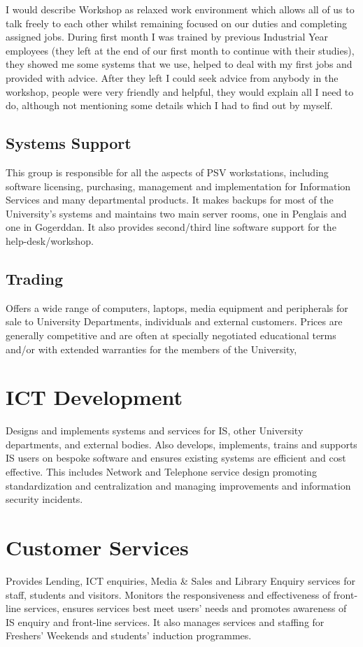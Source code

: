 \documentclass[10pt,a4paper,headinclude=true]{report}
\begin{document}
I would describe Workshop as relaxed work environment which allows all of us to talk freely to each other whilst remaining focused on our duties and completing assigned jobs. During first month I was trained by previous Industrial Year employees (they left at the end of our first month to continue with their studies), they showed me some systems that we use, helped to deal with my first jobs and provided with advice. After they left I could seek advice from anybody in the workshop, people were very friendly and helpful, they would explain all I need to do, although not mentioning some details which I had to find out by myself.
\subsection{Systems Support}
This group is responsible for all the aspects of PSV workstations, including software licensing, purchasing, management and implementation for Information Services and many departmental products. It makes backups for most of the University's systems and maintains two main server rooms, one in Penglais and one in Gogerddan. It also provides second/third line software support for the help-desk/workshop.
\subsection{Trading}
Offers a wide range of computers, laptops, media equipment and peripherals for sale to University Departments, individuals and external customers. Prices are generally competitive and are often at specially negotiated educational terms and/or with extended warranties for the members of the University,
\section{ICT Development}
Designs and implements systems and services for IS, other University departments, and external bodies. Also develops, implements, trains and supports IS users on bespoke software and ensures existing systems are efficient and cost effective. This includes Network and Telephone service design promoting standardization and centralization and managing improvements and information security incidents.
\section{Customer Services}
Provides Lending, ICT enquiries, Media \& Sales and Library Enquiry services for staff, students and visitors. Monitors the responsiveness and effectiveness of front-line services, ensures services best meet users' needs and promotes awareness of IS enquiry and front-line services. It also manages services and staffing for Freshers' Weekends and students' induction programmes.
\end{document}
